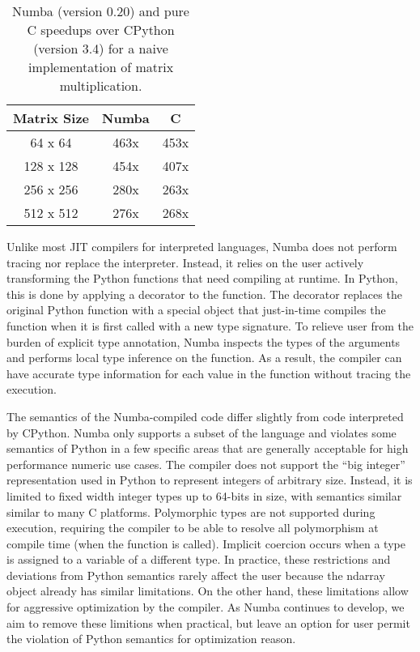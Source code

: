 \documentclass{acm_proc_article-sp}
\begin{document}
\begin{table}
\centering
\label{table:speedup}
\caption{Numba (version 0.20) and pure C speedups over CPython (version 3.4) for a naive implementation of matrix multiplication.}
\begin{tabular}{|c|c|c|} \hline
\textbf{Matrix Size} & \textbf{Numba} & \textbf{C}\\ \hline
64 x 64 & 463x & 453x \\ \hline
128 x 128 & 454x & 407x \\ \hline
256 x 256 & 280x & 263x \\ \hline
512 x 512 & 276x & 268x \\ \hline
\end{tabular}
\end{table}



Unlike most JIT compilers for interpreted languages, Numba does not
perform tracing nor replace the interpreter.  Instead, it relies on
the user actively transforming the Python functions that need
compiling at runtime.  In Python, this is done by applying a decorator
to the function.  The decorator replaces the original Python function
with a special object that just-in-time compiles the function when it
is first called with a new type signature.  To relieve user from the
burden of explicit type annotation, Numba inspects the types of the
arguments and performs local type inference on the function.  As a
result, the compiler can have accurate type information for each value
in the function without tracing the execution.

The semantics of the Numba-compiled code differ slightly from code
interpreted by CPython. Numba only supports a subset of the language
and violates some semantics of Python in a few specific areas that are
generally acceptable for high performance numeric use cases.  The
compiler does not support the ``big integer'' representation used in
Python to represent integers of arbitrary size.  Instead, it is
limited to fixed width integer types up to 64-bits in size, with
semantics similar similar to many C platforms.  Polymorphic types are
not supported during execution, requiring the compiler to be able to
resolve all polymorphism at compile time (when the function is
called).  Implicit coercion occurs when a type is assigned to a
variable of a different type. In practice, these restrictions and
deviations from Python semantics rarely affect the user because the
ndarray object already has similar limitations. On the other hand,
these limitations allow for aggressive optimization by the compiler.
As Numba continues to develop, we aim to remove these limitions when
practical, but leave an option for user permit the violation of Python
semantics for optimization reason.
\end{document}
